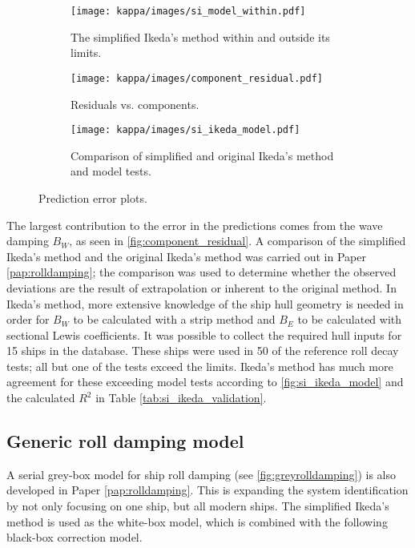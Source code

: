 \begin{figure}[h!]
\centering
    \begin{subfigure}[b]{0.45\textwidth}
    
        \centering
        \texttt{[image: kappa/images/si\_model\_within.pdf]}
        \caption{The simplified Ikeda's method within and outside its limits.}
        \label{fig:si_model_within}
    \end{subfigure}
    \hfill
    \begin{subfigure}[b]{0.45\textwidth}
        \centering
        \texttt{[image: kappa/images/component\_residual.pdf]}
        \vspace{-0.2cm}
        \caption{Residuals vs. components.}
        \label{fig:component_residual}
        \vspace{0.3cm}
    \end{subfigure}
    \hfill
    \begin{subfigure}[b]{0.45\textwidth}
        \centering
        \texttt{[image: kappa/images/si\_ikeda\_model.pdf]}
        \caption{Comparison of simplified and original Ikeda's method and model tests.}
        \label{fig:si_ikeda_model}
    \end{subfigure}

    \caption{Prediction error plots.}
\end{figure}

\noindent The largest contribution to the error in the predictions comes from the wave damping $B_W$, as seen in \autoref{fig:component_residual}. A comparison of the simplified Ikeda's method and the original Ikeda's method was carried out in Paper \ref{pap:rolldamping}; the comparison was used to determine whether the observed deviations are the result of extrapolation or inherent to the original method. In Ikeda's method, more extensive knowledge of the ship hull geometry is needed in order for $B_W$ to be calculated with a strip method and $B_E$ to be calculated with sectional Lewis coefficients. It was possible to collect the required hull inputs for 15 ships in the database. These ships were used in 50 of the reference roll decay tests; all but one of the tests exceed the limits. Ikeda's method has much more agreement for these exceeding model tests according to \autoref{fig:si_ikeda_model} and the calculated $R^2$ in Table \ref{tab:si_ikeda_validation}.


\subsection{Generic roll damping model}
\label{sec:genericrolldampingmodel}
A serial grey-box model for ship roll damping (see \autoref{fig:greyrolldamping}) is also developed in Paper \ref{pap:rolldamping}. 
This is expanding the system identification by not only focusing on one ship, but all modern ships. 
The simplified Ikeda's method \cite{kawaharaSimplePredictionFormula2011} is used as the white-box model, which is combined with the following black-box correction model.

